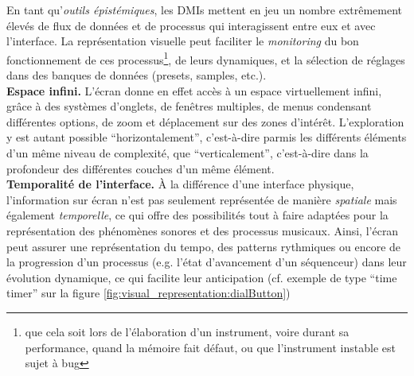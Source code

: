 \noindent En tant qu'\textit{outils épistémiques}, les \glspl{DMI} mettent en jeu un nombre extrêmement élevés de flux de données et de processus qui interagissent entre eux et avec l'interface. La représentation visuelle peut faciliter le \textit{monitoring} du bon fonctionnement de ces processus\footnote{que cela soit lors de l'élaboration d'un instrument, voire durant sa performance, quand la mémoire fait défaut, ou que l'instrument instable est sujet à bug}, de leurs dynamiques, et la sélection de réglages dans des banques de données (presets, samples, etc.).\\
\noindent \textbf{Espace infini.} L'écran donne en effet accès à un espace virtuellement infini, grâce à des systèmes d'onglets, de fenêtres multiples, de menus condensant différentes options, de zoom et déplacement sur des zones d'intérêt. L'exploration y est autant possible ``horizontalement'', c'est-à-dire parmis les différents éléments d'un même niveau de complexité, que ``verticalement'', c'est-à-dire dans la profondeur des différentes couches d'un même élément.\\
\noindent \textbf{Temporalité de l'interface.} À la différence d'une interface physique, l'information sur écran n'est pas seulement représentée de manière \textit{spatiale} mais également \textit{temporelle}, ce qui offre des possibilités tout à faire adaptées pour la représentation des phénomènes sonores et des processus musicaux. Ainsi, l'écran peut assurer une représentation du tempo, des patterns rythmiques ou encore de la progression d'un processus (e.g. l'état d'avancement d'un séquenceur) dans leur évolution dynamique, ce qui facilite leur anticipation (cf. exemple de type ``time timer'' sur la figure \ref{fig:visual_representation:dialButton})\\
